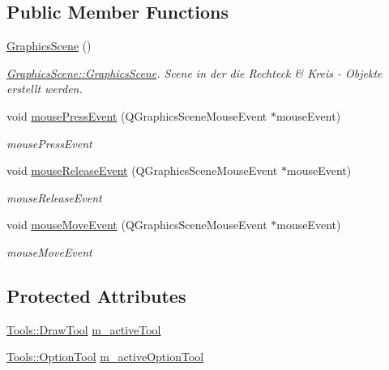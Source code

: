 \subsection*{Public Member Functions}
\begin{DoxyCompactItemize}
\item 
\hyperlink{class_graphics_scene_a5a6ac24fb693cce13e3d69c0c38311c9}{Graphics\+Scene} ()
\begin{DoxyCompactList}\small\item\em \hyperlink{class_graphics_scene_a5a6ac24fb693cce13e3d69c0c38311c9}{Graphics\+Scene\+::\+Graphics\+Scene}. Scene in der die Rechteck \& Kreis -\/ Objekte erstellt werden. \end{DoxyCompactList}\item 
void \hyperlink{class_graphics_scene_a68d455a648fe4a6717a1771c7fe04f31}{mouse\+Press\+Event} (Q\+Graphics\+Scene\+Mouse\+Event $\ast$mouse\+Event)
\begin{DoxyCompactList}\small\item\em mouse\+Press\+Event \end{DoxyCompactList}\item 
void \hyperlink{class_graphics_scene_aadc9534ab8b8fbb5e7c02a0b761c750a}{mouse\+Release\+Event} (Q\+Graphics\+Scene\+Mouse\+Event $\ast$mouse\+Event)
\begin{DoxyCompactList}\small\item\em mouse\+Release\+Event \end{DoxyCompactList}\item 
void \hyperlink{class_graphics_scene_a85927a0baa140f37d2c918866c6879f1}{mouse\+Move\+Event} (Q\+Graphics\+Scene\+Mouse\+Event $\ast$mouse\+Event)
\begin{DoxyCompactList}\small\item\em mouse\+Move\+Event \end{DoxyCompactList}\end{DoxyCompactItemize}
\subsection*{Protected Attributes}
\begin{DoxyCompactItemize}
\item 
\hyperlink{class_tools_ab031688a77e89a80ce8b5db7014684a3}{Tools\+::\+Draw\+Tool} \hyperlink{class_graphics_scene_aea13f23ba3e463916435ec72eb381207}{m\+\_\+active\+Tool}
\item 
\hyperlink{class_tools_a4b55b2ca4eef4d80ae1042233832bb8b}{Tools\+::\+Option\+Tool} \hyperlink{class_graphics_scene_ad17292fb79972e11c2a829da9baf3dca}{m\+\_\+active\+Option\+Tool}
\end{DoxyCompactItemize}


